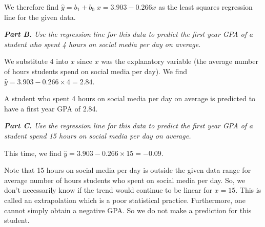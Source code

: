 \documentclass[12pt]{article}
\begin{document}
We therefore find $\hat{y} = b_1 +  b_0 \; x= 3.903 - 0.266 x$ as the least squares regression line for the given data.

\textit{\textbf{Part B.} Use the regression line for this data to predict the first year GPA of a student who spent 4 hours on social media per day on average.}

We substitute 4 into $x$ since $x$ was the explanatory variable (the average number of hours students spend on social media per day). We find $\hat{y} = 3.903 - 0.266 \times 4 = 2.84$.

A student who spent 4 hours on social media per day on average is predicted to have a first year GPA of 2.84.

\textit{\textbf{Part C.} Use the regression line for this data to predict the first year GPA of a student spend 15 hours on social media per day on average.}

This time, we find $\hat{y} = 3.903 - 0.266 \times 15 = -0.09$.

Note that 15 hours on social media per day is outside the given data range for average number of hours students who spent on social media per day. So, we don't necessarily know if the trend would continue to be linear for $x = 15$.  This is called an extrapolation which is a poor statistical practice. Furthermore, one cannot simply obtain a negative GPA. So we do not make a prediction for this student.
\end{document}
